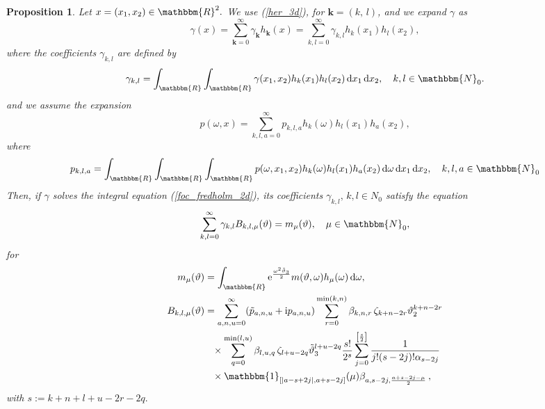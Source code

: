 \documentclass[a4paper,twoside,10pt]{article}
\theoremstyle{break}
\newtheorem{proposition}[proposition]{Proposition}
\theoremstyle{nonumberplain}
\newcommand{\R}{\mathbbm{R}}
\newcommand{\N}{\mathbbm{N}}
\newcommand{\id}{\mathbbm{1}}
\newcommand{\e}{\mathrm e}
\renewcommand{\i}{\mathrm i}
\renewcommand{\d}{\,\mathrm d}
\begin{document}
\begin{proposition}\label{propo_2d}
Let $x=(x_1 , x_2)\in\R^2.$ We use (\ref{her_3d}), for $\bm k = (k,\,l)$, and we expand $\gamma$ as
\begin{equation}\label{foc_expan_gamma_2d}
\gamma (x) = \sum_{\bm k=0}^\infty \gamma_{\bm k} h_{\bm k} (x) = \sum_{k,l=0}^\infty \gamma_{ k,l} h_{k} (x_1) h_l (x_2),
\end{equation}
where the coefficients $\gamma_{k,l}$ are defined by
\begin{equation*}%
\gamma_{k,l} = \int_\R \int_\R \gamma (x_1 ,x_2) h_k (x_1 ) h_l (x_2 ) \d x_1 \d x_2 ,\quad k,l \in \N_0 .
\end{equation*}
and we assume the expansion
\begin{equation}\label{foc_expan_pat_2d}
p (\omega, x) = \sum_{k,l,a=0}^\infty p_{k,l,a} h_k (\omega)   h_l (x_1) h_a (x_2) ,
\end{equation}
where 
\[
p_{k,l,a} = \int_{\R}\int_{\R}\int_{\R} p (\omega, x_1 ,x_2) h_k (\omega) h_l (x_1) h_a (x_2) \d \omega  \d x_1 \d x_2 , \quad k,l,a \in \N_0 
\]
Then, if $\gamma$ solves the integral equation (\ref{foc_fredholm_2d}), its coefficients $\gamma_{k,l}, \, k,l\in N_0$ satisfy the equation
\begin{equation}\label{2d_full_7}
\sum_{k,l=0}^\infty \gamma_{k,l} B_{k,l,\mu} (\vartheta) = m_\mu (\vartheta), \quad \mu \in \N_0,
\end{equation}
for 
\begin{equation*}%
\begin{aligned}
 m_\mu (\vartheta) &= \int_\R \e^{\frac{\omega^2 \tilde\vartheta_3 }2 } m (\vartheta , \omega) h_\mu (\omega) \d \omega ,\\
 B_{k,l,\mu} (\vartheta) &=  \sum_{a,n,u=0}^\infty (\tilde p_{a,n,u} +\i p_{a,n,u} )   \sum_{r=0}^{\min (k,n)} \beta_{k,n,r}
\, \zeta_{k+n-2r}   \vartheta_2^{k+n-2r} \\
&\phantom{=}\times \sum_{q=0}^{\min (l,u)} \beta_{l,u,q} \,\zeta_{l+u-2q}   \tilde\vartheta_3^{l+u-2q} 
\frac{s!}{2^s} \sum_{j=0}^{\left[ \frac{s}{2}\right] } \frac{1}{j!(s-2j)! \alpha_{s-2j}}  \\ &\phantom{=}\times \id_{[\vert a-s+2j \vert,  a+s-2j]} (\mu) \beta_{a,s-2j,\frac{a+s-2j-\mu}2} \,,
\end{aligned}
\end{equation*}
with $s:= k+n+l+u-2r-2q.$
\end{proposition}
\end{document}
